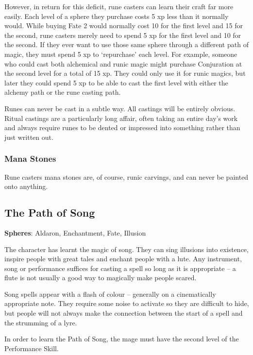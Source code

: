\begin{multicols}{2}
However, in return for this deficit, rune casters can learn their craft far more easily.
Each level of a sphere they purchase costs 5 \gls{xp} less than it normally would.
While buying Fate 2 would normally cost 10 for the first level and 15 for the second, rune casters merely need to spend 5 \gls{xp} for the first level and 10 for the second.
If they ever want to use those same sphere through a different path of magic, they must spend 5 \gls{xp} to `repurchase' each level.
For example, someone who could cast both alchemical and runic magic might purchase Conjuration at the second level for a total of 15 \gls{xp}.
They could only use it for runic magics, but later they could spend 5 \gls{xp} to be able to cast the first level with either the alchemy path or the rune casting path.

Runes can never be cast in a subtle way. All castings will be entirely obvious. Ritual castings are a particularly long affair, often taking an entire day's work and always require runes to be dented or impressed into something rather than just written out.

\subsubsection{Mana Stones}

Rune casters mana stones are, of course, runic carvings, and can never be painted onto anything.

\subsection{The Path of Song}

\label{song}\textbf{Spheres}: Aldaron, Enchantment, Fate, Illusion

The character has learnt the magic of song. They can sing illusions into existence, inspire people with great tales and enchant people with a lute. Any instrument, song or performance suffices for casting a spell so long as it is appropriate -- a flute is not usually a good way to magically make people scared.

Song spells appear with a flash of colour -- generally on a cinematically appropriate note. They require some noise to activate so they are difficult to hide, but people will not always make the connection between the start of a spell and the strumming of a lyre.

In order to learn the Path of Song, the mage must have the second level of the Performance Skill. 


\end{multicols}
